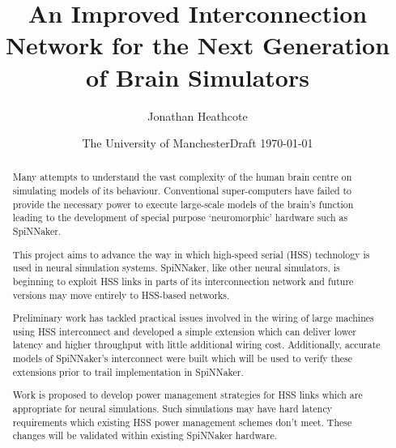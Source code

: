 \documentclass[a4paper,12pt,titlepage]{report}
\title{An Improved Interconnection Network for the Next Generation of Brain
Simulators}
\author{Jonathan Heathcote}
\date{The University of Manchester}
\date{Draft \today}
\begin{document}
	
	\maketitle
	
	\begin{abstract}
		
		Many attempts to understand the vast complexity of the human brain centre on
		simulating models of its behaviour. Conventional super-computers have failed
		to provide the necessary power to execute large-scale models of the brain's
		function leading to the development of special purpose `neuromorphic'
		hardware such as SpiNNaker.
		
		This project aims to advance the way in which high-speed serial (HSS)
		technology is used in neural simulation systems. SpiNNaker, like other
		neural simulators, is beginning to exploit HSS links in parts of its
		interconnection network and future versions may move entirely to HSS-based
		networks.
		
		Preliminary work has tackled practical issues involved in the wiring of
		large machines using HSS interconnect and developed a simple extension which
		can deliver lower latency and higher throughput with little additional
		wiring cost. Additionally, accurate models of SpiNNaker's interconnect were
		built which will be used to verify these extensions prior to trail
		implementation in SpiNNaker.
		
		Work is proposed to develop power management strategies for HSS links which
		are appropriate for neural simulations. Such simulations may have hard
		latency requirements which existing HSS power management schemes don't meet.
		These changes will be validated within existing SpiNNaker hardware.
		
	\end{abstract}
	
	\tableofcontents
	\listoffigures
	
	
	
	
	
	
	
	
	
	
\end{document}
